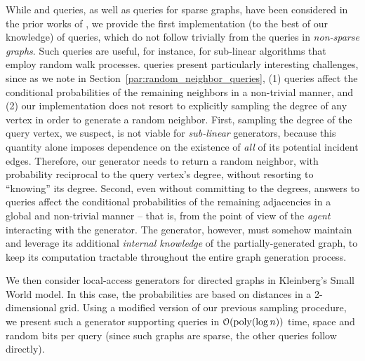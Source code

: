 While  and  queries, as well as  queries for sparse graphs,
have been considered in the prior works of \cite{reut, huge_old, huge, sparse}, we provide the first implementation (to the best of our knowledge)
of  queries, which do not follow trivially from the  queries in \emph{non-sparse graphs}.
Such queries are useful, for instance, for sub-linear algorithms that employ random walk processes.
 queries present particularly interesting challenges,  since as we note in Section~\ref{par:random_neighbor_queries},
(1)  queries affect the conditional probabilities of the remaining neighbors in a non-trivial manner, and
(2) our implementation does not resort to explicitly sampling the degree of any vertex in order to generate a random neighbor.
First, sampling the degree of the query vertex, we suspect, is not viable for \emph{sub-linear} generators,
because this quantity alone imposes dependence on the existence of \emph{all} of its potential incident edges.
Therefore, our generator needs to return a random neighbor, with probability reciprocal to the query vertex's degree,
without resorting to ``knowing'' its degree.
Second, even without committing to the degrees, answers to  queries
affect the conditional probabilities of the remaining adjacencies in a global and non-trivial manner
-- that is, from the point of view of the \emph{agent} interacting with the generator.
The generator, however, must somehow maintain and leverage its additional \emph{internal knowledge}
of the partially-generated graph, to keep its computation tractable throughout the entire graph generation process.

We then consider local-access generators for directed graphs in Kleinberg's Small World model.
In this case, the probabilities are based on distances in a 2-dimensional grid.
Using a modified version of our previous sampling procedure, we present such a generator supporting  queries in
$\mathcal{O}(\mathrm{poly}(\log n))$ time, space and random bits per query (since such graphs are sparse, the other queries follow directly).

